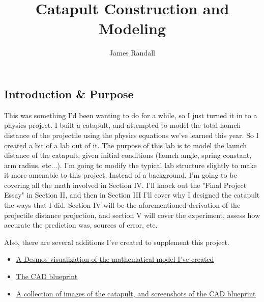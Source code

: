 \documentclass[10pt]{article}
\author{James Randall}
\title{Catapult Construction and Modeling}
\begin{document}
\maketitle


\begin{flushleft} 
\section{Introduction \& Purpose}
  This was something I'd been wanting to do for a while, so I just turned it in to a physics project.
  I built a catapult, and attempted to model the total launch distance of the projectile using the physics equations we've learned this year.
  So I created a bit of a lab out of it.
  The purpose of this lab is to model the launch distance of the catapult, given initial conditions (launch angle, spring constant, arm radius, etc...).
  I'm going to modify the typical lab structure slightly to make it more amenable to this project. 
  Instead of a background, I'm going to be covering all the math involved in Section IV.
  I'll knock out the "Final Project Essay" in Section II, and then in Section III I'll cover why I designed the catapult the ways that I did.
  Section IV will be the aforementioned derivation of the projectile distance projection, and section V will cover the experiment, assess how accurate the prediction was, sources of error, etc.  
  
  \par
  Also, there are several additions I've created to supplement this project. 
  \begin{itemize}
    \item \href{https://www.desmos.com/calculator/lioxjeyth8}{\underline{A Desmos visualization of the mathematical model I've created}} 
    \item \href{https://cad.onshape.com/documents/a21afbbb73f6dd6201e3b395/w/34e6c49428357ac916a3dcfd/e/86ecc9ec480ab3b6357f0414?renderMode=0&uiState=643624c739388d13bb3344de}{\underline{The CAD blueprint}}
    \item \href{https://imgur.com/a/iidlyPC}{\underline{A collection of images of the catapult, and screenshots of the CAD blueprint}} 
  \end{itemize}

  

\end{flushleft}
\end{document}
